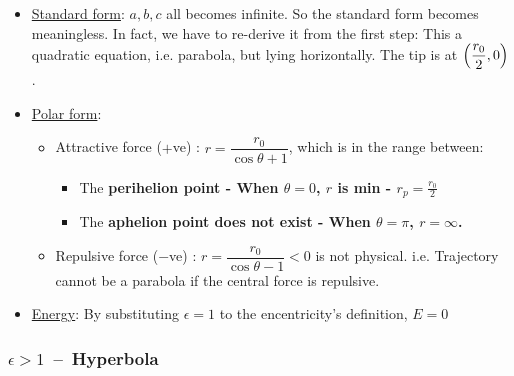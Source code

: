 \documentclass[class=article, crop=false, 12pt]{standalone}
\begin{document}
\begin{itemize}
    

    \item \ul{Standard form}: $a,b,c$ all becomes infinite. 
    So the standard form becomes meaningless. 
    In fact, we have to re-derive it from the first step:
    This a quadratic equation, i.e. parabola, but lying horizontally. 
    The tip is at $\qty(\dfrac{r_0}{2},0)$.

    \item \ul{Polar form}:
    \begin{itemize}
        \item Attractive force ($+$ve) : $r=\dfrac{r_0}{\cos\theta + 1}$,
        which is in the range between:
        \begin{itemize}
            \item The \bf{perihelion} point - When $\theta=0$, $r$ is min - $\boxed{r_p = \frac{r_0}{2}}$
            
            \item The \bf{aphelion} point does not exist - When $\theta=\pi$, $r=\infty$.
        \end{itemize}
    
        \item Repulsive force ($-$ve) : $r=\dfrac{r_0}{\cos\theta - 1} <0$ is not physical. 
        i.e. Trajectory cannot be a parabola if the central force is repulsive.

    \end{itemize}

    \item \ul{Energy}: By substituting $\epsilon=1$ to the encentricity's definition, $\boxed{E=0}$


\end{itemize}



\subsubsection{$\epsilon>1$ \,--\, Hyperbola}
\end{document}
